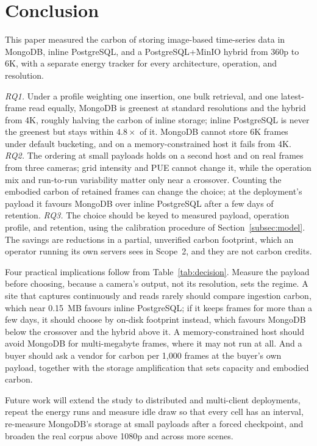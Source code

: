 \documentclass[pdflatex,sn-basic]{sn-jnl}%
\begin{document}
\section{Conclusion}\label{sec:conclusion}

{\color{markup}This paper measured the carbon of storing image-based time-series data in MongoDB, inline PostgreSQL, and a PostgreSQL+MinIO hybrid from 360p to 6K, with a separate energy tracker for every architecture, operation, and resolution.}

{\color{markup}\emph{RQ1.} Under a profile weighting one insertion, one bulk retrieval, and one latest-frame read equally, MongoDB is greenest at standard resolutions and the hybrid from 4K, roughly halving the carbon of inline storage; inline PostgreSQL is never the greenest but stays within $4.8\times$ of it.} {\color{markup}MongoDB cannot store 6K frames under default bucketing, and on a memory-constrained host it fails from 4K.} {\color{markup}\emph{RQ2.} The ordering at small payloads holds on a second host and on real frames from three cameras; grid intensity and PUE cannot change it, while the operation mix and run-to-run variability matter only near a crossover.} {\color{markup}Counting the embodied carbon of retained frames can change the choice; at the deployment's payload it favours MongoDB over inline PostgreSQL after a few days of retention.} {\color{markup}\emph{RQ3.} The choice should be keyed to measured payload, operation profile, and retention, using the calibration procedure of Section~\ref{subsec:model}.} {\color{markup}The savings are reductions in a partial, unverified carbon footprint, which an operator running its own servers sees in Scope~2, and they are not carbon credits.}

{\color{markup}Four practical implications follow from Table~\ref{tab:decision}.} {\color{markup}Measure the payload before choosing, because a camera's output, not its resolution, sets the regime.} {\color{markup}A site that captures continuously and reads rarely should compare ingestion carbon, which near 0.15~MB favours inline PostgreSQL; if it keeps frames for more than a few days, it should choose by on-disk footprint instead, which favours MongoDB below the crossover and the hybrid above it.} {\color{markup}A memory-constrained host should avoid MongoDB for multi-megabyte frames, where it may not run at all.} {\color{markup}And a buyer should ask a vendor for carbon per 1{,}000 frames at the buyer's own payload, together with the storage amplification that sets capacity and embodied carbon.}

{\color{markup}Future work will extend the study to distributed and multi-client deployments, repeat the energy runs and measure idle draw so that every cell has an interval, re-measure MongoDB's storage at small payloads after a forced checkpoint, and broaden the real corpus above 1080p and across more scenes.}

\backmatter


\end{document}
